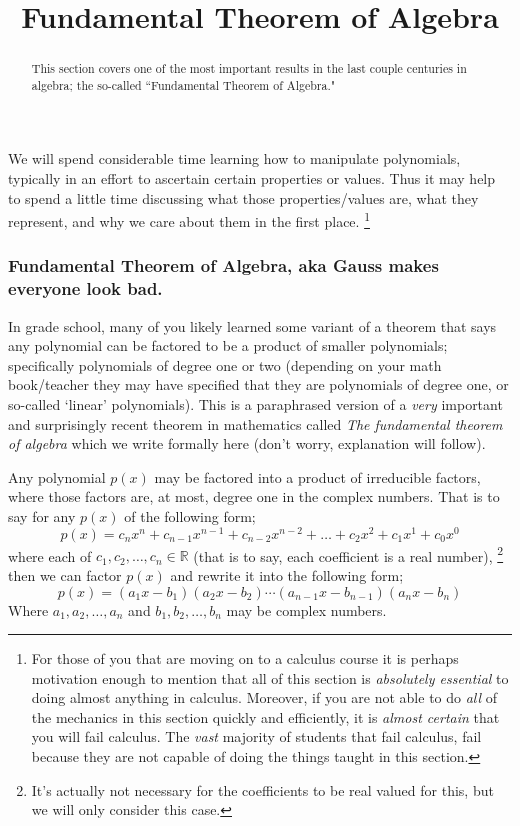 \documentclass{ximeraXloud}
\title{Fundamental Theorem of Algebra}
\begin{document}
\begin{abstract}
    This section covers one of the most important results in the last couple centuries in algebra; the so-called ``Fundamental Theorem of Algebra."
\end{abstract}
\maketitle

We will spend considerable time learning how to manipulate polynomials, typically in an effort to ascertain certain properties or values. Thus it may help to spend a little time discussing what those properties/values are, what they represent, and why we care about them in the first place.%
\footnote{For those of you that are moving on to a calculus course it is perhaps motivation enough to mention that all of this section is \textit{absolutely essential} to doing almost anything in calculus. Moreover, if you are not able to do \textit{all} of the mechanics in this section quickly and efficiently, it is \textit{almost certain} that you will fail calculus. The \textit{vast} majority of students that fail calculus, fail because they are not capable of doing the things taught in this section.}

\subsubsection*{Fundamental Theorem of Algebra, aka Gauss makes everyone look bad.}
    In grade school, many of you likely learned some variant of a theorem that says any polynomial can be factored to be a product of smaller polynomials; specifically polynomials of degree one or two (depending on your math book/teacher they may have specified that they are polynomials of degree one, or so-called `linear' polynomials). This is a paraphrased version of a \textit{very} important and surprisingly recent theorem in mathematics called \textit{The fundamental theorem of algebra} which we write formally here (don't worry, explanation will follow).
    \begin{theorem}
        Any polynomial $p(x)$ may be factored into a product of irreducible factors, where those factors are, at most, degree one in the complex numbers. That is to say for any $p(x)$ of the following form;
        \[
            p(x) = c_nx^n + c_{n-1}x^{n-1} + c_{n-2}x^{n-2} + \dots + c_2x^2 + c_1x^1 + c_0x^0
        \]
        where each of $c_1, c_2, \dots, c_n \in \mathbb{R}$ (that is to say, each coefficient is a real number),%
        \footnote{It's actually not necessary for the coefficients to be real valued for this, but we will only consider this case.}
        then we can factor $p(x)$ and rewrite it into the following form;
        \[
            p(x) = (a_1x - b_1)(a_2x - b_2) \cdots (a_{n-1}x - b_{n-1})(a_nx - b_n)
        \]
        Where $a_1, a_2, \dots, a_n$ and $b_1, b_2, \dots, b_n$ may be complex numbers.
    \end{theorem}
    
\end{document}
